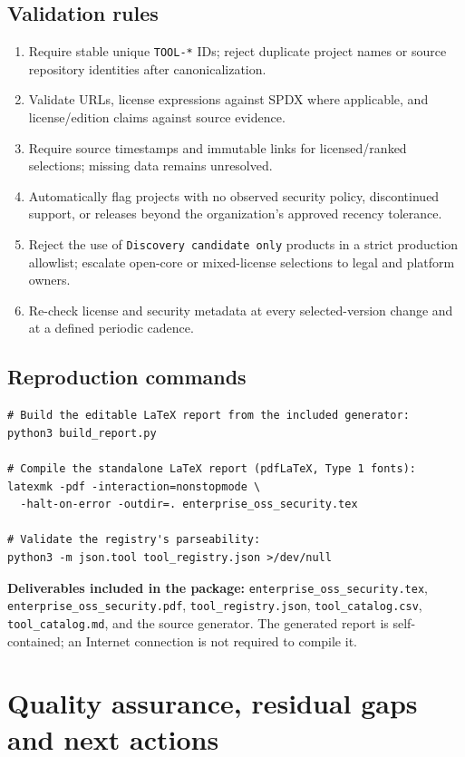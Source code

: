 \documentclass[11pt,oneside]{report}
\begin{document}
\section{Validation rules}
\begin{enumerate}[leftmargin=1.6em]
\item Require stable unique \texttt{TOOL-*} IDs; reject duplicate project names or source repository identities after canonicalization.
\item Validate URLs, license expressions against SPDX where applicable, and license/edition claims against source evidence.
\item Require source timestamps and immutable links for licensed/ranked selections; missing data remains unresolved.
\item Automatically flag projects with no observed security policy, discontinued support, or releases beyond the organization's approved recency tolerance.
\item Reject the use of \texttt{Discovery candidate only} products in a strict production allowlist; escalate open-core or mixed-license selections to legal and platform owners.
\item Re-check license and security metadata at every selected-version change and at a defined periodic cadence.
\end{enumerate}
\section{Reproduction commands}
\begin{verbatim}
# Build the editable LaTeX report from the included generator:
python3 build_report.py

# Compile the standalone LaTeX report (pdfLaTeX, Type 1 fonts):
latexmk -pdf -interaction=nonstopmode \
  -halt-on-error -outdir=. enterprise_oss_security.tex

# Validate the registry's parseability:
python3 -m json.tool tool_registry.json >/dev/null
\end{verbatim}
\textbf{Deliverables included in the package:} \texttt{enterprise\_oss\_security.tex}, \texttt{enterprise\_oss\_security.pdf}, \texttt{tool\_registry.json}, \texttt{tool\_catalog.csv}, \texttt{tool\_catalog.md}, and the source generator. The generated report is self-contained; an Internet connection is not required to compile it.

\chapter{Quality assurance, residual gaps and next actions}
\end{document}
